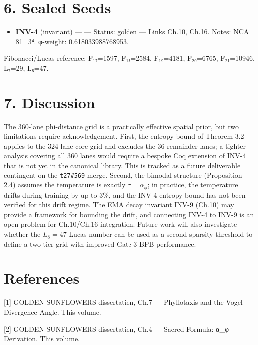 \section{6. Sealed Seeds}\label{fa_16:sealed-seeds}

\begin{itemize}
\tightlist
\item
  \textbf{INV-4} (invariant) ---
  --- Status: golden --- Links Ch.10, Ch.16.
  Notes: NCA 81=3⁴. φ-weight: 0.618033988768953.
\end{itemize}

Fibonacci/Lucas reference: F₁₇=1597, F₁₈=2584,
F₁₉=4181, F₂₀=6765, F₂₁=10946, L₇=29, L₈=47.

\section{7. Discussion}\label{fa_16:discussion}

The 360-lane phi-distance grid is a practically
effective spatial prior, but two limitations
require acknowledgement. First, the entropy bound
of Theorem 3.2 applies to the 324-lane core grid
and excludes the 36 remainder lanes; a tighter
analysis covering all 360 lanes would require a
bespoke Coq extension of INV-4 that is not yet in
the canonical library. This is tracked as a future
deliverable contingent on the \texttt{t27\#569}
merge. Second, the bimodal structure (Proposition
2.4) assumes the temperature is exactly
\(\tau = \alpha_\phi\); in practice, the
temperature drifts during training by up to 3\%,
and the INV-4 entropy bound has not been verified
for this drift regime. The EMA decay invariant
INV-9 (Ch.10) may provide a framework for bounding
the drift, and connecting INV-4 to INV-9 is an
open problem for Ch.10/Ch.16 integration. Future
work will also investigate whether the
\(L_8 = 47\) Lucas number can be used as a second
sparsity threshold to define a two-tier grid with
improved Gate-3 BPB performance.

\section{References}\label{fa_16:references}

[1] GOLDEN SUNFLOWERS dissertation, Ch.7 ---
Phyllotaxis and the Vogel Divergence Angle. This
volume.

[2] GOLDEN SUNFLOWERS dissertation, Ch.4 ---
Sacred Formula: α\_φ Derivation. This volume.

